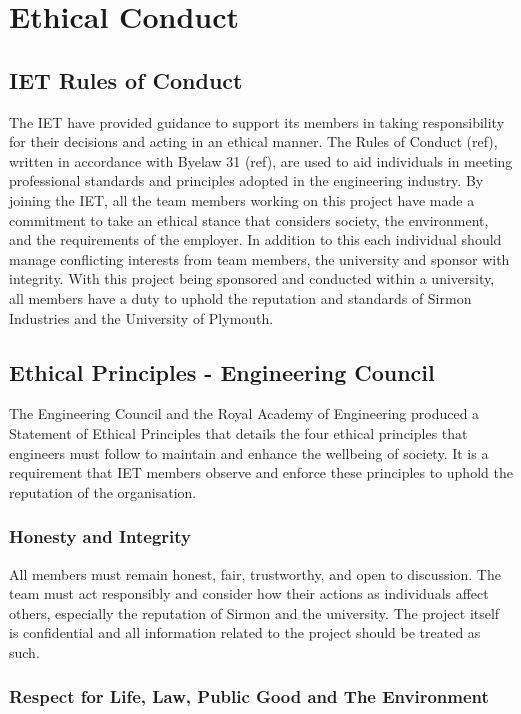 \documentclass [12pt]{article}
\begin{document}
\section{Ethical Conduct}\label{sec:ethics}
\subsection{IET Rules of Conduct}\label{sec:IET_rules_of_conduct}
The IET have provided guidance to support its members in taking responsibility for their decisions and acting in an ethical manner. The Rules of Conduct (ref), written in accordance with Byelaw 31 (ref), are used to aid individuals in meeting professional standards and principles adopted in the engineering industry. By joining the IET, all the team members working on this project have made a commitment to take an ethical stance that considers society, the environment, and the requirements of the employer. In addition to this each individual should manage conflicting interests from team members, the university and sponsor with integrity. With this project being sponsored and conducted within a university, all members have a duty to uphold the reputation and standards of Sirmon Industries and the University of Plymouth.

\subsection{Ethical Principles - Engineering Council}\label{sec:ethical_principles_engc}

The Engineering Council and the Royal Academy of Engineering produced a Statement of Ethical Principles that details the four ethical principles that engineers must follow to maintain and enhance the wellbeing of society. It is a requirement that IET members observe and enforce these principles to uphold the reputation of the organisation.

\subsubsection{Honesty and Integrity}

All members must remain honest, fair, trustworthy, and open to discussion. The team must act responsibly and consider how their actions as individuals affect others, especially the reputation of Sirmon and the university. The project itself is confidential and all information related to the project
should be treated as such.

\subsubsection{Respect for Life, Law, Public Good and The Environment}
\end{document}
